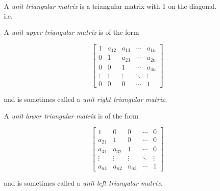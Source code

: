 \documentclass[12pt]{article}
\begin{document}
A \emph{unit triangular matrix} is a triangular matrix with $1$ on the diagonal.\\i.e.

A \emph{unit upper triangular matrix} is of the form

$$ \begin{bmatrix}
1 & a_{12} & a_{13} & \cdots & a_{1n} \\
0 & 1 & a_{23} & \cdots & a_{2n} \\
0 & 0 & 1 & \cdots & a_{3n} \\
\vdots & \vdots & \vdots & \ddots & \vdots \\
0 & 0 & 0 & \cdots & 1
\end{bmatrix} $$

and is sometimes called a \emph{unit right triangular matrix}.

A \emph{unit lower triangular matrix} is of the form

$$ \begin{bmatrix}
1 & 0 & 0 & \cdots & 0 \\
a_{21} & 1 & 0 & \cdots & 0 \\
a_{31} & a_{32} & 1 & \cdots & 0 \\
\vdots & \vdots & \vdots & \ddots & \vdots \\
a_{n1} & a_{n2} & a_{n3} & \cdots & 1
\end{bmatrix} $$

and is sometimes called a \emph{unit left triangular matrix}.
\end{document}
